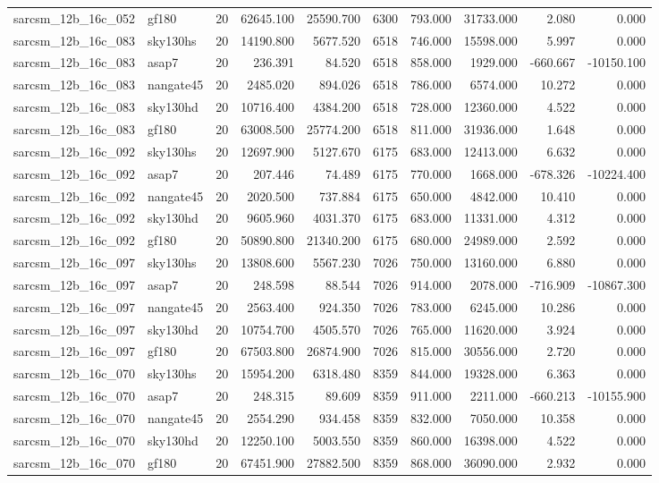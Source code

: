 \begin{longtable}{llrrrrrrrr}
sarcsm\_12b\_16c\_052 & gf180 & 20 & 62645.100 & 25590.700 & 6300 & 793.000 & 31733.000 & 2.080 & 0.000 \\
sarcsm\_12b\_16c\_083 & sky130hs & 20 & 14190.800 & 5677.520 & 6518 & 746.000 & 15598.000 & 5.997 & 0.000 \\
sarcsm\_12b\_16c\_083 & asap7 & 20 & 236.391 & 84.520 & 6518 & 858.000 & 1929.000 & -660.667 & -10150.100 \\
sarcsm\_12b\_16c\_083 & nangate45 & 20 & 2485.020 & 894.026 & 6518 & 786.000 & 6574.000 & 10.272 & 0.000 \\
sarcsm\_12b\_16c\_083 & sky130hd & 20 & 10716.400 & 4384.200 & 6518 & 728.000 & 12360.000 & 4.522 & 0.000 \\
sarcsm\_12b\_16c\_083 & gf180 & 20 & 63008.500 & 25774.200 & 6518 & 811.000 & 31936.000 & 1.648 & 0.000 \\
sarcsm\_12b\_16c\_092 & sky130hs & 20 & 12697.900 & 5127.670 & 6175 & 683.000 & 12413.000 & 6.632 & 0.000 \\
sarcsm\_12b\_16c\_092 & asap7 & 20 & 207.446 & 74.489 & 6175 & 770.000 & 1668.000 & -678.326 & -10224.400 \\
sarcsm\_12b\_16c\_092 & nangate45 & 20 & 2020.500 & 737.884 & 6175 & 650.000 & 4842.000 & 10.410 & 0.000 \\
sarcsm\_12b\_16c\_092 & sky130hd & 20 & 9605.960 & 4031.370 & 6175 & 683.000 & 11331.000 & 4.312 & 0.000 \\
sarcsm\_12b\_16c\_092 & gf180 & 20 & 50890.800 & 21340.200 & 6175 & 680.000 & 24989.000 & 2.592 & 0.000 \\
sarcsm\_12b\_16c\_097 & sky130hs & 20 & 13808.600 & 5567.230 & 7026 & 750.000 & 13160.000 & 6.880 & 0.000 \\
sarcsm\_12b\_16c\_097 & asap7 & 20 & 248.598 & 88.544 & 7026 & 914.000 & 2078.000 & -716.909 & -10867.300 \\
sarcsm\_12b\_16c\_097 & nangate45 & 20 & 2563.400 & 924.350 & 7026 & 783.000 & 6245.000 & 10.286 & 0.000 \\
sarcsm\_12b\_16c\_097 & sky130hd & 20 & 10754.700 & 4505.570 & 7026 & 765.000 & 11620.000 & 3.924 & 0.000 \\
sarcsm\_12b\_16c\_097 & gf180 & 20 & 67503.800 & 26874.900 & 7026 & 815.000 & 30556.000 & 2.720 & 0.000 \\
sarcsm\_12b\_16c\_070 & sky130hs & 20 & 15954.200 & 6318.480 & 8359 & 844.000 & 19328.000 & 6.363 & 0.000 \\
sarcsm\_12b\_16c\_070 & asap7 & 20 & 248.315 & 89.609 & 8359 & 911.000 & 2211.000 & -660.213 & -10155.900 \\
sarcsm\_12b\_16c\_070 & nangate45 & 20 & 2554.290 & 934.458 & 8359 & 832.000 & 7050.000 & 10.358 & 0.000 \\
sarcsm\_12b\_16c\_070 & sky130hd & 20 & 12250.100 & 5003.550 & 8359 & 860.000 & 16398.000 & 4.522 & 0.000 \\
sarcsm\_12b\_16c\_070 & gf180 & 20 & 67451.900 & 27882.500 & 8359 & 868.000 & 36090.000 & 2.932 & 0.000 \\
\end{longtable}

